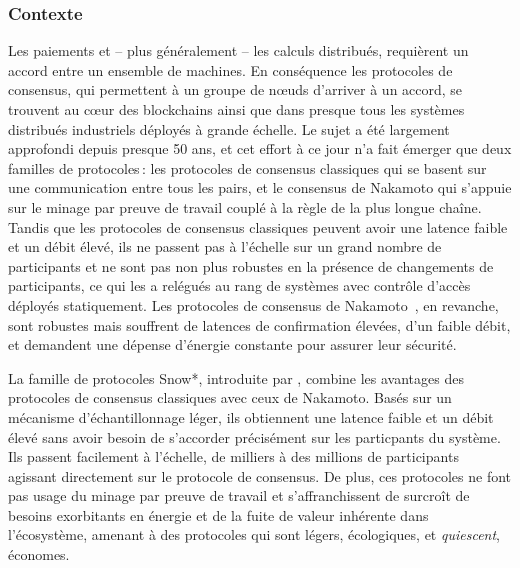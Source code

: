 \documentclass[runningheads,francais,a4paper]{llncs}
\begin{document}
\subsubsection{Contexte}
Les paiements et -- plus généralement -- les calculs distribués, requièrent un accord entre un ensemble de machines. En
conséquence les protocoles de consensus, qui permettent à un groupe de nœuds d'arriver à un accord, se trouvent au cœur
des blockchains ainsi que dans presque tous les systèmes distribués industriels déployés à grande échelle. Le sujet a
été largement approfondi depuis presque 50 ans, et cet effort à ce jour n'a fait émerger que deux familles de
protocoles\,: les protocoles de consensus classiques qui se basent sur une communication entre tous les pairs, et le
consensus de Nakamoto qui s'appuie sur le minage par preuve de travail couplé à la règle de la plus longue chaîne.
Tandis que les protocoles de consensus classiques peuvent avoir une latence faible et un débit élevé, ils ne passent
pas à l'échelle sur un grand nombre de participants et ne sont pas non plus robustes en la présence de changements de
participants, ce qui les a relégués au rang de systèmes avec contrôle d'accès déployés statiquement. Les protocoles de
consensus de Nakamoto~\cite{nakamoto2008bitcoin,wood2014ethereum,EyalGSR16}, en revanche, sont robustes mais souffrent
de latences de confirmation élevées, d'un faible débit, et demandent une dépense d'énergie constante pour assurer leur
sécurité.

La famille de protocoles Snow*, introduite par \AVAPlatformName{}, combine les avantages des protocoles de consensus
classiques avec ceux de Nakamoto. Basés sur un mécanisme d'échantillonnage léger, ils obtiennent une
latence faible et un débit élevé sans avoir besoin de s'accorder précisément sur les particpants du système.
Ils passent facilement à l'échelle, de milliers à des millions de participants agissant directement sur le protocole de
consensus. De plus, ces protocoles ne font pas usage du minage par preuve de travail et s'affranchissent de surcroît
de besoins exorbitants en énergie et de la fuite de valeur inhérente dans l'écosystème, amenant à des protocoles qui
sont légers, écologiques, et \emph{quiescent}, économes. %
\end{document}
